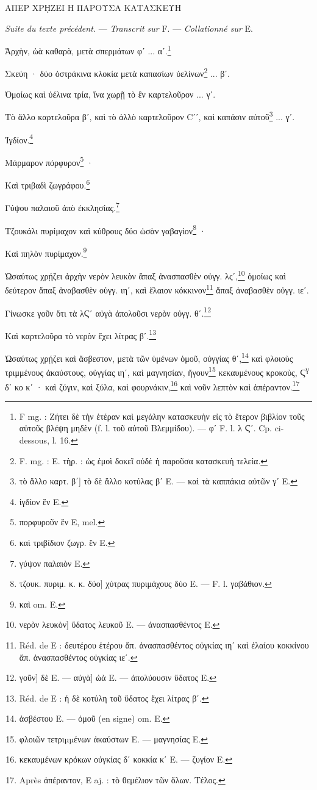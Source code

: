 \documentclass[a4paper, 11pt, oneside, polutonikogreek, french]{article}
\begin{document}
ΑΠΕΡ ΧΡῌΖΕΙ Η ΠΑΡΟΥΣΑ ΚΑΤΑΣΚΕΥΗ

\emph{Suite du texte précédent.} --- \emph{Transcrit sur} F. --- \emph{Collationné sur} E.

Ἀρχὴν, ὠὰ καθαρὰ, μετὰ σπερμάτων φʹ ... αʹ.\footnote{F mg. : Ζήτει δὲ τὴν ἑτέραν καὶ μεγάλην κατασκευὴν εἰς τὸ ἕτερον βιβλίον τοῦς αὐτοῦς βλέψη μηδὲν (f. l. τοῦ αὐτοῦ Βλεμμίδου). --- φʹ F. l. λ Ϛʹ. Cp. ci-dessous, l. 16.}

Σκεύη · δύο ὀστράκινα κλοκία μετὰ καπασίων ὑελίνων\footnote{F. mg. : Ε. τὴρ. : ὡς ἐμοὶ δοκεῖ οὐδὲ ἡ παροῦσα κατασκευὴ τελεία.} ... βʹ.

Ὁμοίως καὶ ὑέλινα τρία, ἵνα χωρῇ τὸ ἓν καρτελοῦρον ... γʹ.

Τὸ ἄλλο καρτελοῦρα βʹ, καὶ τὸ ἀλλὸ καρτελοῦρον Cʹʹ, καὶ καπάσιν αὐτοῦ\footnote{τὸ ἄλλο καρτ. β΄] τὸ δὲ ἄλλο κοτύλας βʹ E. --- καὶ τὰ καππάκια αὐτῶν γʹ E.} ... γʹ.

Ἰγδίον.\footnote{ἰγδίον ἓν E.}

Μάρμαρον πόρφυρον\footnote{πορφυροῦν ἓν E, mel.} ·

Καὶ τριβαδὶ ζωγράφου.\footnote{καὶ τριβίδιον ζωγρ. ἓν Ε.}

Γύψου παλαιοῦ ἀπὸ ἐκκλησίας.\footnote{γύψον παλαιὸν E.}

Τζουκάλι πυρίμαχον καὶ κύθρους δύο ὡσὰν γαβαγίον\footnote{τζουκ. πυριμ. κ. κ. δύο] χύτρας πυριμάχους δύο E. --- F. l. γαβάθιον.} ·

Καὶ πηλὸν πυρίμαχον.\footnote{καὶ om. E.}

Ὡσαύτως χρῄζει ἀρχὴν νερὸν λευκὸν ἅπαξ ἀνασπασθὲν οὐγγ. λςʹ,\footnote{νερὸν λευκὸν] ὕδατος λευκοῦ E. --- ἀνασπασθέντος E.} ὁμοίως καὶ δεύτερον ἅπαξ ἀναβασθὲν οὐγγ. ιηʹ, καὶ ἔλαιον κόκκινον\footnote{Réd. de E : δευτέρου ἑτέρου ἅπ. ἀνασπασθέντος οὐγκίας ιηʹ καὶ ἐλαίου κοκκίνου ἅπ. ἀνασπασθέντος οὐγκίας ιεʹ.} ἅπαξ ἀναβασθὲν οὐγγ. ιεʹ.

Γίνωσκε γοῦν ὅτι τὰ λϚʹ αὐγὰ ἀπολοῦσι νερὸν οὐγγ. θʹ.\footnote{γοῦν] δὲ E. --- αὐγὰ] ὠὰ E. --- ἀπολύουσιν ὕδατος E.}

Καὶ καρτελοῦρα τὸ νερὸν ἔχει λίτρας βʹ.\footnote{Réd. de E : ἡ δὲ κοτύλη τοῦ ὕδατος ἔχει λίτρας βʹ.}

Ὡσαύτως χρῄζει καὶ ἄσβεστον, μετὰ τῶν ὑμένων ὁμοῦ, οὐγγίας θʹ,\footnote{ἀσβέστου E. --- ὁμοῦ (en signe) om. E.} καὶ φλοιοὺς τριμμένους ἀκαύστους, οὐγγίας ιηʹ, καὶ μαγνησίαν, ἤγουν\footnote{φλοιῶν τετριµµένων ἀκαύστων E. --- μαγνησίας E.} κεκαυμένους κροκοὺς, Ϛ\textsuperscript{γ} δʹ κο κʹ · καὶ ζύγιν, καὶ ξύλα, καὶ φουρνάκιν,\footnote{κεκαυμένων κρόκων οὐγκίας δʹ κοκκία κʹ E. --- ζυγίον E.} καὶ νοῦν λεπτὸν καὶ ἀπέραντον.\footnote{Après ἀπέραντον, E aj. : τὸ θεμέλιον τῶν ὅλων. Τέλος.}
\end{document}
